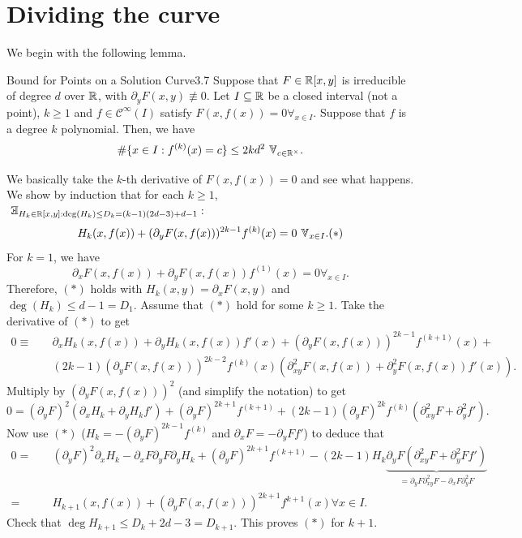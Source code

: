 \documentclass{Vorlesungstemplate_English} %
\begin{document}
\section{Dividing the curve}
We begin with the following lemma.
\begin{lemma}{Bound for Points on a Solution Curve}{3.7}
  Suppose that $F \in \mathbb{R}[x,y]$ is irreducible of degree $d$ over $\mathbb{R}$, with $\partial_yF(x,y) \not\equiv 0$. Let $I \subseteq \mathbb{R}$ be a closed interval (not a point), $k \geq 1$ and $f \in \mathcal{C}^{\infty}(I)$ satisfy $F(x,f(x)) = 0 \forall_{x \in I}$.
  Suppose that $f$ is  a degree $k$ polynomial. Then, we have
  \[ \#\{ x \in I: f^{(k)}(x) = c\} \leq 2kd^2 \forall_{c \in \R^\times}.\]
\end{lemma}
\begin{pf}
  We basically take the $k$-th derivative of $F(x,f(x)) = 0$ and see what happens. We show by induction that for each $k \geq 1$,
  $\exists_{H_k \in \R[x,y]: \deg(H_k) \leq D_k = (k-1)(2d-3)+d-1}:$
  \[ H_k(x,f(x)) + (\partial_yF(x,f(x)))^{2k-1}f^{(k)}(x) = 0 \forall_{x \in I}. \hfill (*)\]
  For $k=1$, we have
  \[ \partial_xF(x,f(x)) + \partial_yF(x,f(x))f^{(1)}(x) = 0 \forall_{x \in I}.\]
  Therefore, $(*)$ holds with $H_k(x,y) = \partial_xF(x,y)$ and $\deg(H_k) \leq d-1 = D_1$. Assume that $(*)$ hold for some $k \geq 1$. Take the derivative of $(*)$ to get
  \begin{align*} 0 \equiv \quad & \partial_xH_k(x,f(x)) + \partial_yH_k(x,f(x))f'(x) + (\partial_yF(x,f(x)))^{2k-1}f^{(k+1)}(x) + \\
  \quad & (2k-1)(\partial_yF(x,f(x)))^{2k-2}f^{(k)}(x)(\partial^2_{xy}F(x,f(x))+\partial^2_yF(x,f(x))f'(x)).\end{align*}
  Multiply by $(\partial_yF(x,f(x)))^2$ (and simplify the notation) to get
  \[ 0 = (\partial_yF)^2(\partial_xH_k + \partial_yH_kf') + (\partial_yF)^{2k+1}f^{(k+1)} + (2k-1)(\partial_yF)^{2k}f^{(k)}(\partial_{xy}^2F + \partial_y^2f').\]
  Now use $(*)$ ($H_k = -(\partial_yF)^{2k-1}f^{(k)}$ and $\partial_xF = -\partial_yFf'$) to deduce that
  \begin{align*} 0 = \quad & (\partial_yF)^2\partial_xH_k -\partial_xF\partial_yF\partial_yH_k + (\partial_yF)^{2k+1}f^{(k+1)}-(2k-1)H_k\underbrace{\partial_yF(\partial_{xy}^2F + \partial_y^2Ff')}_{= \partial_yF\partial_{xy}^2F-\partial_xF\partial^2_{y}F} \\
  = \quad & H_{k+1}(x,f(x)) + (\partial_yF(x,f(x)))^{2k+1}f^{k+1}(x) \forall x \in I.\end{align*}
  Check that $\deg H_{k+1} \leq D_k + 2d-3 = D_{k+1}$. This proves $(*)$ for $k+1$.

\end{pf}
\end{document}
